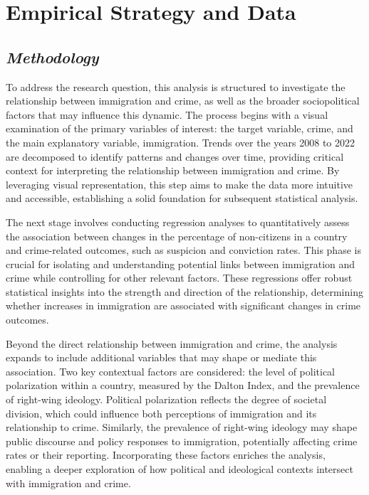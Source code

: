\documentclass[
]{article}
\begin{document}
\section{Empirical Strategy and Data}\label{empirical-strategy-and-data}

\subsection{\texorpdfstring{\emph{Methodology}}{Methodology}}\label{methodology}

To address the research question, this analysis is structured to
investigate the relationship between immigration and crime, as well as
the broader sociopolitical factors that may influence this dynamic. The
process begins with a visual examination of the primary variables of
interest: the target variable, crime, and the main explanatory variable,
immigration. Trends over the years 2008 to 2022 are decomposed to
identify patterns and changes over time, providing critical context for
interpreting the relationship between immigration and crime. By
leveraging visual representation, this step aims to make the data more
intuitive and accessible, establishing a solid foundation for subsequent
statistical analysis.

The next stage involves conducting regression analyses to quantitatively
assess the association between changes in the percentage of non-citizens
in a country and crime-related outcomes, such as suspicion and
conviction rates. This phase is crucial for isolating and understanding
potential links between immigration and crime while controlling for
other relevant factors. These regressions offer robust statistical
insights into the strength and direction of the relationship,
determining whether increases in immigration are associated with
significant changes in crime outcomes.

Beyond the direct relationship between immigration and crime, the
analysis expands to include additional variables that may shape or
mediate this association. Two key contextual factors are considered: the
level of political polarization within a country, measured by the Dalton
Index, and the prevalence of right-wing ideology. Political polarization
reflects the degree of societal division, which could influence both
perceptions of immigration and its relationship to crime. Similarly, the
prevalence of right-wing ideology may shape public discourse and policy
responses to immigration, potentially affecting crime rates or their
reporting. Incorporating these factors enriches the analysis, enabling a
deeper exploration of how political and ideological contexts intersect
with immigration and crime.
\end{document}
